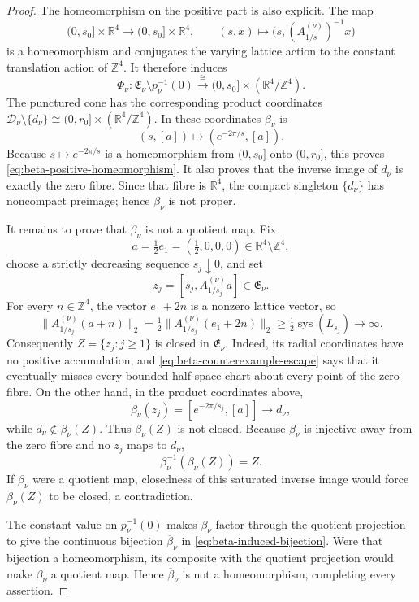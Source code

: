 \documentclass[11pt,letterpaper]{article}
\numberwithin{equation}{section}
\theoremstyle{definition}
\theoremstyle{remark}
\newcommand{\R}{\mathbb R}
\newcommand{\Z}{\mathbb Z}
\newcommand{\sys}{\operatorname{sys}}
\begin{document}
\begin{proof}
The homeomorphism on the positive part is also explicit.  The map
\[
 (0,s_0]\times\R^4\longrightarrow(0,s_0]\times\R^4,
 \qquad
 (s,x)\longmapsto\bigl(s,(A_{1/s}^{(\nu)})^{-1}x\bigr)
\]
is a homeomorphism and conjugates the varying lattice action to the
constant translation action of \(\Z^4\).  It therefore induces
\[
 \Phi_\nu:
 \mathfrak E_\nu\setminus p_\nu^{-1}(0)
 \xrightarrow{\ \cong\ }(0,s_0]\times(\R^4/\Z^4).
\]
The punctured cone has the corresponding product coordinates
\(\mathcal D_\nu\setminus\{d_\nu\}\cong
(0,r_0]\times(\R^4/\Z^4)\).  In these coordinates \(\beta_\nu\) is
\[
 (s,[a])\longmapsto(e^{-2\pi/s},[a]).
\]
Because \(s\mapsto e^{-2\pi/s}\) is a homeomorphism from
\((0,s_0]\) onto \((0,r_0]\), this proves
\cref{eq:beta-positive-homeomorphism}.  It also proves that the inverse
image of \(d_\nu\) is exactly the zero fibre.  Since that fibre is
\(\R^4\), the compact singleton \(\{d_\nu\}\) has noncompact preimage;
hence \(\beta_\nu\) is not proper.

It remains to prove that \(\beta_\nu\) is not a quotient map.  Fix
\[
 a=\tfrac12e_1=(\tfrac12,0,0,0)\in\R^4\setminus\Z^4,
\]
choose a strictly decreasing sequence \(s_j\downarrow0\), and set
\begin{equation}
 z_j=[s_j,A_{1/s_j}^{(\nu)}a]\in\mathfrak E_\nu.
 \label{eq:beta-counterexample}
\end{equation}
For every \(n\in\Z^4\), the vector \(e_1+2n\) is a nonzero lattice
vector, so
\begin{equation}
 \|A_{1/s_j}^{(\nu)}(a+n)\|_2
 =\tfrac12\|A_{1/s_j}^{(\nu)}(e_1+2n)\|_2
 \geq\tfrac12\sys(L_{s_j})\longrightarrow\infty.
 \label{eq:beta-counterexample-escape}
\end{equation}
Consequently \(Z=\{z_j:j\geq1\}\) is closed in \(\mathfrak E_\nu\).
Indeed, its radial coordinates have no positive accumulation, and
\cref{eq:beta-counterexample-escape} says that it eventually misses every
bounded half-space chart about every point of the zero fibre.  On the
other hand, in the product coordinates above,
\[
 \beta_\nu(z_j)=[e^{-2\pi/s_j},[a]]
 \longrightarrow d_\nu,
\]
while \(d_\nu\notin\beta_\nu(Z)\).  Thus \(\beta_\nu(Z)\) is not closed.
Because \(\beta_\nu\) is injective away from the zero fibre and no \(z_j\)
maps to \(d_\nu\),
\[
 \beta_\nu^{-1}(\beta_\nu(Z))=Z.
\]
If \(\beta_\nu\) were a quotient map, closedness of this saturated inverse
image would force \(\beta_\nu(Z)\) to be closed, a contradiction.

The constant value on \(p_\nu^{-1}(0)\) makes \(\beta_\nu\) factor through
the quotient projection to give the continuous bijection
\(\overline\beta_\nu\) in \cref{eq:beta-induced-bijection}.  Were that
bijection a homeomorphism, its composite with the quotient projection
would make \(\beta_\nu\) a quotient map.  Hence
\(\overline\beta_\nu\) is not a homeomorphism, completing every assertion.
\end{proof}
\end{document}

